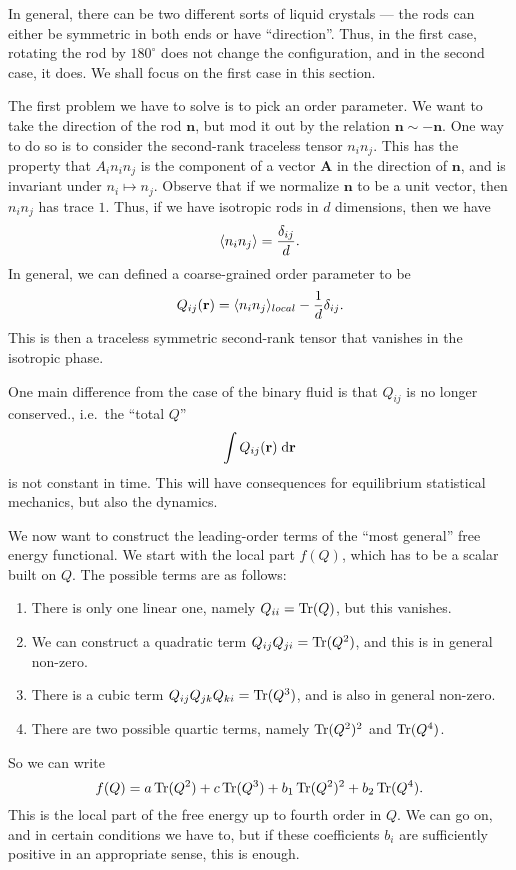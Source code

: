 \documentclass[a4paper]{article}
\begin{document}
In general, there can be two different sorts of liquid crystals --- the rods can either be symmetric in both ends or have ``direction''. Thus, in the first case, rotating the rod by $180^\circ$ does not change the configuration, and in the second case, it does. We shall focus on the first case in this section.

The first problem we have to solve is to pick an order parameter. We want to take the direction of the rod $\mathbf{n}$, but mod it out by the relation $\mathbf{n} \sim -\mathbf{n}$. One way to do so is to consider the second-rank traceless tensor $n_i n_j$. This has the property that $A_i n_i n_j$ is the component of a vector $\mathbf{A}$ in the direction of $\mathbf{n}$, and is invariant under $n_i \mapsto n_j$. Observe that if we normalize $\mathbf{n}$ to be a unit vector, then $n_i n_j$ has trace $1$. Thus, if we have isotropic rods in $d$ dimensions, then we have
\[
  \langle n_i n_j \rangle = \frac{\delta_{ij}}{d}.
\]
In general, we can defined a coarse-grained order parameter to be
\[
  Q_{ij} (\mathbf{r}) = \langle n_i n_j\rangle_{local} - \frac{1}{d} \delta_{ij}.
\]
This is then a traceless symmetric second-rank tensor that vanishes in the isotropic phase.

One main difference from the case of the binary fluid is that $Q_{ij}$ is no longer conserved., i.e.\ the ``total $Q$''
\[
  \int Q_{ij}(\mathbf{r})\;\mathrm{d} \mathbf{r}
\]
is not constant in time. This will have consequences for equilibrium statistical mechanics, but also the dynamics.

We now want to construct the leading-order terms of the ``most general'' free energy functional. We start with the local part $f(Q)$, which has to be a scalar built on $Q$. The possible terms are as follows:
\begin{enumerate}
  \item There is only one linear one, namely $Q_{ii} = \operatorname{Tr}(Q)$, but this vanishes.
  \item We can construct a quadratic term $Q_{ij} Q_{ji} = \operatorname{Tr}(Q^2)$, and this is in general non-zero.
  \item There is a cubic term $Q_{ij} Q_{jk} Q_{ki} = \operatorname{Tr}(Q^3)$, and is also in general non-zero.
  \item There are two possible quartic terms, namely $\operatorname{Tr}(Q^2)^2$ and $\operatorname{Tr}(Q^4)$.
\end{enumerate}
So we can write
\[
  f(Q) = a\operatorname{Tr}(Q^2) + c \operatorname{Tr}(Q^3) + b_1 \operatorname{Tr}(Q^2)^2 + b_2 \operatorname{Tr}(Q^4).
\]
This is the local part of the free energy up to fourth order in $Q$. We can go on, and in certain conditions we have to, but if these coefficients $b_i$ are sufficiently positive in an appropriate sense, this is enough.
\end{document}
